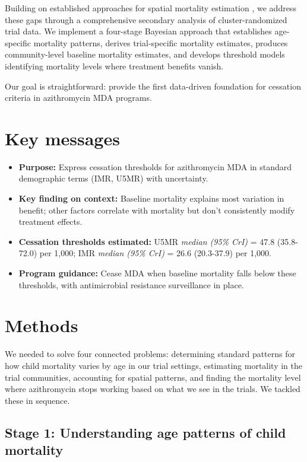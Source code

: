 \documentclass[11pt]{article}\usepackage[]{graphicx}\usepackage[]{xcolor}
\begin{document}
Building on established approaches for spatial mortality estimation \citep{besag1991bym, wakefield2020insr}, we address these gaps through a comprehensive secondary analysis of cluster-randomized trial data. We implement a four-stage Bayesian approach that establishes age-specific mortality patterns, derives trial-specific mortality estimates, produces community-level baseline mortality estimates, and develops threshold models identifying mortality levels where treatment benefits vanish.

Our goal is straightforward: provide the first data-driven foundation for cessation criteria in azithromycin MDA programs.

\section*{Key messages}



\begin{itemize}[leftmargin=1.1em]
\item \textbf{Purpose:} Express cessation thresholds for azithromycin MDA in standard demographic terms (IMR, U5MR) with uncertainty.
\item \textbf{Key finding on context:} Baseline mortality explains most variation in benefit; other factors correlate with mortality but don't consistently modify treatment effects.
\item \textbf{Cessation thresholds estimated:} U5MR \emph{median (95\% CrI)} = 47.8 (35.8-72.0) per 1,000; IMR \emph{median (95\% CrI)} = 26.6 (20.3-37.9) per 1,000.
\item \textbf{Program guidance:} Cease MDA when baseline mortality falls below these thresholds, with antimicrobial resistance surveillance in place.
\end{itemize}

\clearpage

\section{Methods}

We needed to solve four connected problems: determining standard patterns for how child mortality varies by age in our trial settings, estimating mortality in the trial communities, accounting for spatial patterns, and finding the mortality level where azithromycin stops working based on what we see in the trials. We tackled these in sequence.

\subsection{Stage 1: Understanding age patterns of child mortality}
\end{document}
